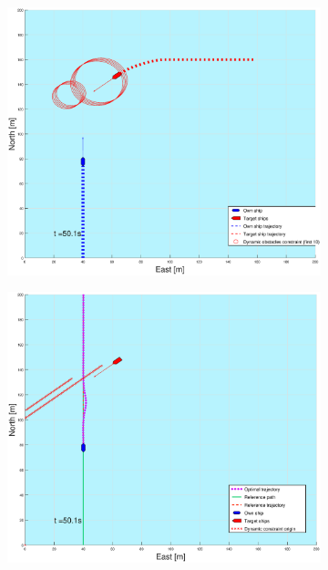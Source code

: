 \begin{figure}[!b]
\begin{subfigure}[b]{0.499\textwidth}
    \end{subfigure}
    \hfill
    \\
    \begin{subfigure}[b]{0.49\textwidth}
        \centering
        \includegraphics[width=\textwidth]{Images/Figures/sving_HO/_Simple_1fig1_time=50}
    \end{subfigure}
    \hfill
    \begin{subfigure}[b]{0.499\textwidth}
        \centering
        \includegraphics[width=\textwidth]{Images/Figures/sving_HO/_Simple_1fig999_time=50}
    \end{subfigure}
    \hfill
\end{figure}%
